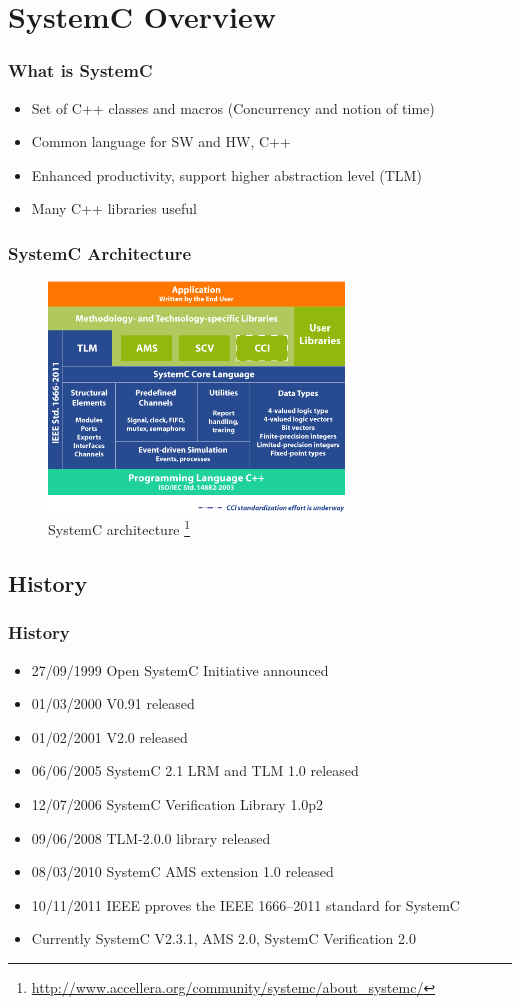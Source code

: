 \documentclass{beamer}
\begin{document}
\section{SystemC Overview}
\begin{frame}\frametitle{What is SystemC}
\begin{itemize}
	\item Set of C++ classes and macros (Concurrency and notion of time)
	\item Common language for SW and HW, C++
	\item Enhanced productivity, support higher abstraction level (TLM)
	\item Many C++ libraries useful
\end{itemize}
\end{frame}

\begin{frame}\frametitle{SystemC Architecture}
    \begin{figure}[hp]
	  \includegraphics[width=0.70\textwidth]{pictures/systemc-architecture}
      \caption{SystemC architecture \footnote{\url{http://www.accellera.org/community/systemc/about_systemc/}}}
      \label{fig:flow}
    \end{figure}
\end{frame}

\subsection{History}
\begin{frame}\frametitle{History} 
\begin{itemize}
	\item 27/09/1999 Open SystemC Initiative announced
	\item 01/03/2000 V0.91 released
	\item 01/02/2001 V2.0 released
	\item 06/06/2005 SystemC 2.1 LRM and TLM 1.0 released
	\item 12/07/2006 SystemC Verification Library 1.0p2
	\item 09/06/2008 TLM-2.0.0 library released
	\item 08/03/2010 SystemC AMS extension 1.0 released
	\item 10/11/2011 IEEE pproves the IEEE 1666–2011 standard for SystemC
	\item Currently SystemC V2.3.1, AMS 2.0, SystemC Verification 2.0
\end{itemize}
\end{frame}
\end{document}

